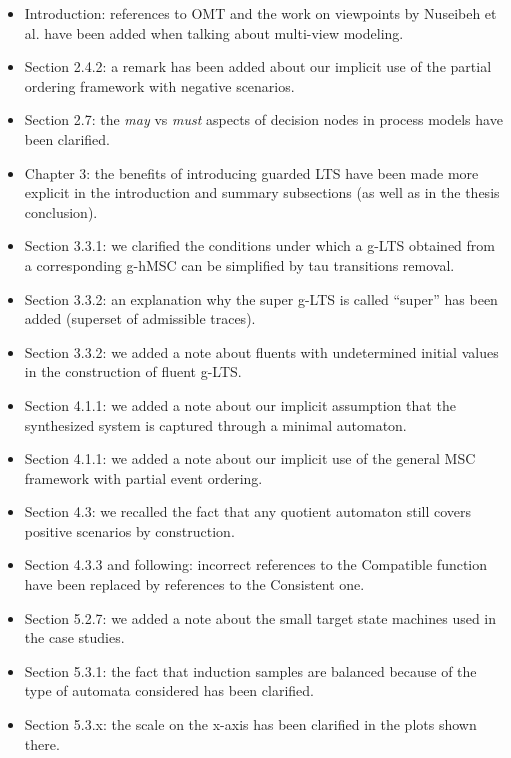 \documentclass[11pt,oneside,a4paper]{article}
\begin{document}
\begin{itemize}
\item Introduction: references to OMT and the work on viewpoints by Nuseibeh et al. have been added when talking about multi-view modeling.
\item Section 2.4.2: a remark has been added about our implicit use of the partial ordering framework with negative scenarios.
\item Section 2.7: the \emph{may} vs \emph{must} aspects of decision nodes in process models have been clarified.
\item Chapter 3: the benefits of introducing guarded LTS have been made more explicit in the introduction and summary subsections (as well as in the thesis conclusion).
\item Section 3.3.1: we clarified the conditions under which a g-LTS obtained from a corresponding g-hMSC can be simplified by tau transitions removal.
\item Section 3.3.2: an explanation why the super g-LTS is called ``super'' has been added (superset of admissible traces).
\item Section 3.3.2: we added a note about fluents with undetermined initial values in the construction of fluent g-LTS.
\item Section 4.1.1: we added a note about our implicit assumption that the synthesized system is captured through a minimal automaton.
\item Section 4.1.1: we added a note about our implicit use of the general MSC framework with partial event ordering.
\item Section 4.3: we recalled the fact that any quotient automaton still covers positive scenarios by construction.
\item Section 4.3.3 and following: incorrect references to the Compatible function have been replaced by references to the Consistent one.
\item Section 5.2.7: we added a note about the small target state machines used in the case studies.
\item Section 5.3.1: the fact that induction samples are balanced because of the type of automata considered has been clarified.
\item Section 5.3.x: the scale on the x-axis has been clarified in the plots shown there.
\end{itemize}
\end{document}
